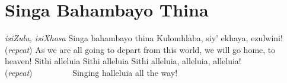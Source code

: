 \starttocol
\chapter{Singa Bahambayo Thina}
\nexttocol
\hfill{\it isiZulu, isiXhosa}
\stoptocol
\starttocol
\startlines
S{\sc inga} bahambayo thina
Kulomhlaba, siy' ekhaya, ezulwini! ({\it repeat})
\stoplines
\nexttocol
As we are all going to depart from this world, we will go home, to heaven!
\stoptocol
\starttocol
\startlines
Sithi alleluia
Sithi alleluia
Sithi alleluia, alleluia, alleluia! \hfill     ({\it repeat})~~~~~~~~~\hfill
\stoplines
\nexttocol
Singing halleluia all the way!
\stoptocol

